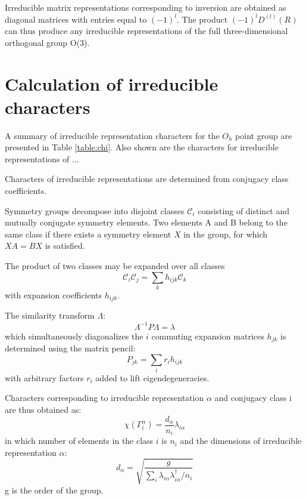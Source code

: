 \documentclass[preprint,showpacs,preprintnumbers,superscriptaddress,prb,floatfix,aps]{revtex4-1}
\newcommand*{\class}{\mathcal{C}}
\begin{document}
Irreducible matrix representations corresponding to inversion are obtained as diagonal matrices with entries equal to $(-1)^l$. The product $(-1)^{l} D^{(l)}(R)$  can thus produce any irreducible representations of the full three-dimensional orthogonal group O(3).\cite{sharma_general_1979,el-batanouny_symmetry_2008} %




%
%
\section{Calculation of irreducible characters}

A summary of irreducible representation characters for the $O_h$ point group are presented in 
Table \ref{table:chi}. Also shown are the characters for irreducible representations of ... 

Characters of irreducible representations are determined from conjugacy class coefficients\cite{burnside_theory_2010,mckay_construction_1970,unger_computing_2006,schneider_dixons_1990,dixon_high_1967}.

Symmetry groups decompose into disjoint classes $\class_i$ consisting of distinct and mutually conjugate symmetry elements. Two elements A and B belong to the same class if there exists a symmetry element $X$ in the group, for which $XA = BX$ is satisfied.

The product of two classes may be expanded over all classes
\begin{equation}
\label{eq:class_coefficients}
\class_i \class_j = \sum_k h_{ijk} \class_k
\end{equation}
with expansion coefficients $h_{ijk}$.

The similarity transform $\Lambda$:
\begin{equation}
\Lambda^{-1} P \Lambda = \lambda
\end{equation}
which simultaneously diagonalizes the $i$ commuting expansion matrices $h_{jk}$ is determined using the matrix pencil:
\begin{equation}
\label{eq:matrix_pencil}
P_{jk} = \sum_i r_i h_{ijk}
\end{equation}
with arbitrary factors $r_i$ added to lift eigendegeneracies.


Characters corresponding to irreducible representation $\alpha$ and conjugacy class i are thus obtained as:
\begin{equation}
\label{eq:irrep_characters}
\chi\left(\Gamma_i^\alpha\right) = \frac{d_\alpha}{n_i} \lambda_{i\alpha}
\end{equation}
in which number of elements in the class $i$ is $n_i$ and the dimensions of irreducible representation $\alpha$:
\begin{equation}
\label{eq:irrep_dimension}
d_\alpha = \sqrt{ \frac{g}{\sum_i \lambda_{i\alpha} \lambda_{i\alpha}^\dag / n_i }  }
\end{equation}
g is the order of the group.
\end{document}
